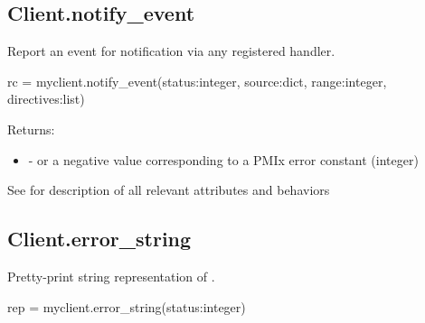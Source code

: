 \subsection{Client.notify_event}

\summary

Report an event for notification via any registered handler.

\format

\pyspecificstart
\begin{codepar}
rc = myclient.notify_event(status:integer, source:dict,
                           range:integer, directives:list)
\end{codepar}
\pyspecificend

\begin{arglist}
\end{arglist}

Returns:
\begin{itemize}
    \item {} -  or a negative value corresponding to a PMIx error constant (integer)
\end{itemize}

See  for description of all relevant attributes and behaviors


\subsection{Client.error_string}

\summary

Pretty-print string representation of .

\format

\pyspecificstart
\begin{codepar}
rep = myclient.error_string(status:integer)
\end{codepar}
\pyspecificend

\begin{arglist}
\end{arglist}

